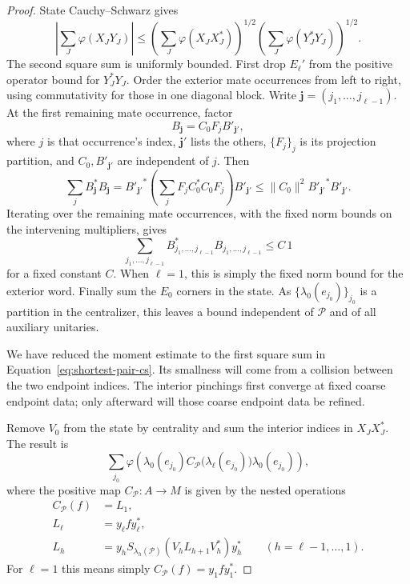 \begin{proof}
State Cauchy--Schwarz gives
\begin{equation}
 \left|\sum_J\varphi(X_JY_J)\right|
 \le
 \left(\sum_J\varphi(X_JX_J^*)\right)^{1/2}
 \left(\sum_J\varphi(Y_J^*Y_J)\right)^{1/2}.
 \label{eq:shortest-pair-cs}
\end{equation}
The second square sum is uniformly bounded. First drop $E_\ell'$ from
the positive operator bound for $Y_J^*Y_J$. Order the exterior mate
occurrences from left to right, using commutativity for those in one
diagonal block. Write $\mathbf j=(j_1,\ldots,j_{\ell-1})$. At the first
remaining mate occurrence, factor
\[
 B_{\mathbf j}=C_0F_jB'_{\mathbf j'},
\]
where $j$ is that occurrence's index, $\mathbf j'$ lists the others,
$\{F_j\}_j$ is its projection partition, and $C_0,B'_{\mathbf j'}$ are
independent of $j$. Then
\[
 \sum_j B_{\mathbf j}^*B_{\mathbf j}
 = {B'_{\mathbf j'}}^*
       \left(\sum_jF_jC_0^*C_0F_j\right)B'_{\mathbf j'}
 \leq\|C_0\|^2{B'_{\mathbf j'}}^*B'_{\mathbf j'}.
\]
Iterating over the remaining mate occurrences, with the fixed norm bounds
on the intervening multipliers, gives
\[
 \sum_{j_1,\ldots,j_{\ell-1}}
 B_{j_1,\ldots,j_{\ell-1}}^*
 B_{j_1,\ldots,j_{\ell-1}}
 \leq C\,1
\]
for a fixed constant $C$. When $\ell=1$, this is simply the fixed norm
bound for the exterior word. Finally sum the $E_0$ corners in the state.
As $\{\lambda_0(e_{j_0})\}_{j_0}$ is a partition in the centralizer, this
leaves a bound independent of $\mathcal P$ and of all auxiliary unitaries.

We have reduced the moment estimate to the first square sum in
Equation~\eqref{eq:shortest-pair-cs}. Its smallness will come from a
collision between the two endpoint indices. The interior pinchings
first converge at fixed coarse endpoint data; only afterward will
those coarse endpoint data be refined.

Remove $V_0$ from the state by centrality and sum the interior indices
in $X_JX_J^*$. The result is
\begin{equation}
 \sum_{j_0}
 \varphi\!\left(
   \lambda_0(e_{j_0})
   C_{\mathcal P}\bigl(\lambda_\ell(e_{j_0})\bigr)
   \lambda_0(e_{j_0})\right),
 \label{eq:endpoint-collision}
\end{equation}
where the positive map $C_{\mathcal P}:A\to M$ is given by the nested
operations
\begin{align*}
 C_{\mathcal P}(f)&=L_1,\\
 L_\ell&=y_\ell f y_\ell^*,\\
 L_h&=y_h S_{\lambda_h(\mathcal P)}
                (V_hL_{h+1}V_h^*)y_h^*
       \qquad(h=\ell-1,\ldots,1).
\end{align*}
For $\ell=1$ this means simply $C_{\mathcal P}(f)=y_1fy_1^*$.


\end{proof}
